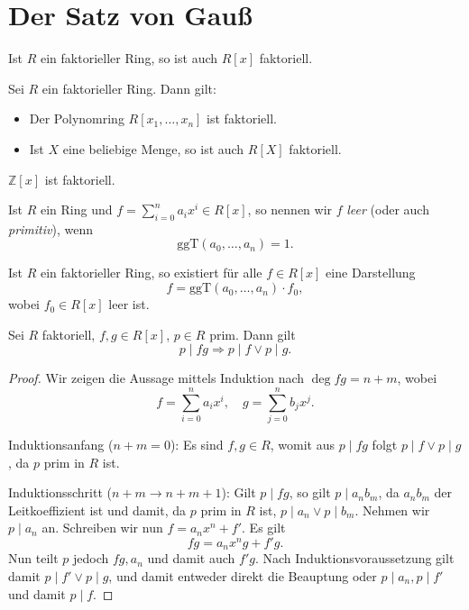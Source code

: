 
\section{Der Satz von Gauß}

\begin{theorem}
    Ist $R$ ein faktorieller Ring, so ist auch $R[x]$ faktoriell.
\end{theorem}

\begin{corollary}
    Sei $R$ ein faktorieller Ring. Dann gilt:
    \begin{itemize}
        \item Der Polynomring $R[x_1, \hdots, x_n]$ ist faktoriell.
        \item Ist $X$ eine beliebige Menge, so ist auch $R[X]$ faktoriell.
    \end{itemize}
\end{corollary}

\begin{corollary}
    $\mathbb{Z}[x]$ ist faktoriell.
\end{corollary}

\begin{definition}
    Ist $R$ ein Ring und $f = \sum_{i=0}^n a_i x^i \in R[x]$, so nennen wir $f$ \emph{leer} (oder auch \emph{primitiv}), wenn
    $$ \mathrm{ggT}( a_0, \hdots, a_n ) = 1. $$
\end{definition}

\begin{remark}
    Ist $R$ ein faktorieller Ring, so existiert für alle $f \in R[x]$ eine Darstellung
    $$ f = \mathrm{ggT}(a_0, \hdots, a_n) \cdot f_0, $$
    wobei $f_0 \in R[x]$ leer ist.
\end{remark}

\begin{lemma}
    Sei $R$ faktoriell, $f, g \in R[x]$, $p \in R$ prim. Dann gilt
    $$ p \mid f g \Rightarrow p \mid f \lor p \mid g. $$
\end{lemma}

\begin{proof}
    Wir zeigen die Aussage mittels Induktion nach $\deg fg = n+m$, wobei
    $$ f = \sum_{i=0}^n a_i x^i,\quad g = \sum_{j=0}^n b_j x^j. $$

    Induktionsanfang ($n+m=0$): Es sind $f, g \in R$, womit aus $p \mid fg$ folgt $p \mid f \lor p \mid g$, da $p$ prim in $R$ ist.

    Induktionsschritt ($n+m \to n+m+1$): Gilt $p \mid fg$, so gilt $p \mid a_n b_m$, da $a_n b_m$ der Leitkoeffizient ist und damit, da $p$ prim in $R$ ist, $p \mid a_n \lor p \mid b_m$. Nehmen wir \obda $p \mid a_n$ an. Schreiben wir nun $f = a_n x^n + f'$. Es gilt
    $$ fg = a_n x^n g + f' g. $$
    Nun teilt $p$ jedoch $fg, a_n$ und damit auch $f' g$. Nach Induktionsvoraussetzung gilt damit $p \mid f' \lor p \mid g$, und damit entweder direkt die Beauptung oder $p \mid a_n, p \mid f'$ und damit $p \mid f$.
\end{proof}

